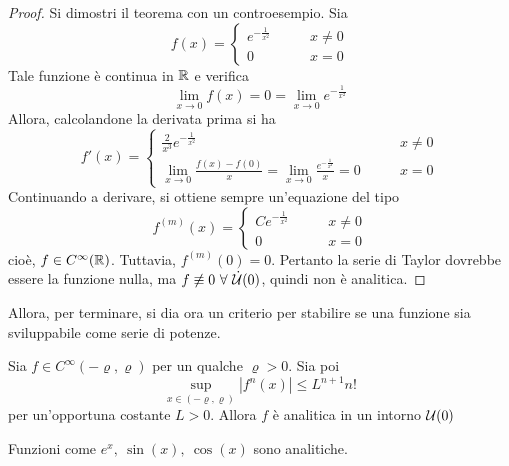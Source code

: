 \begin{proof}
 Si dimostri il teorema con un controesempio. Sia 
 \begin{equation}
     f(x)= \begin{cases}
         e^{-\frac{1}{x^2}} &\qquad x \neq 0\\
         0 &\qquad x=0
     \end{cases}
 \end{equation}
 Tale funzione è continua in $\mathbb{R}$ e verifica 
 \begin{equation}
     \lim_{x \to 0}{f(x)}=0= \lim_{x \to 0}{ e ^{-\frac{1}{x^2}}}
 \end{equation}
 Allora, calcolandone la derivata prima si ha 
 \begin{equation}
     f'(x)= \begin{cases}
         \frac{2}{x^3} e^{-\tfrac{1}{x^2}} & \qquad x \neq 0\\
         \lim\limits_{x \to 0}{\frac{f(x)-f(0)}{x}}= \lim\limits_{x \to 0}{\frac{e^{-\frac{1}{x^2}}}{x}}=0 &\qquad x=0
     \end{cases}
 \end{equation}
 Continuando a derivare, si ottiene sempre un'equazione del tipo
 \begin{equation}
     f^{(m)}(x)=\begin{cases}
         C e^{-\frac{1}{x^2}} &\qquad x\neq0\\
         0 &\qquad x=0
     \end{cases}
 \end{equation}
 cioè, $f \in C^\infty(\mathbb{R})$. Tuttavia, $f^{(m)}(0)=0$. Pertanto la serie di Taylor dovrebbe essere la funzione nulla, ma $f \not\equiv 0\ \forall\ \dot{\mathcal{U}}(0)$, quindi non è analitica.
\end{proof}
Allora, per terminare, si dia ora un criterio per stabilire se una funzione sia sviluppabile come serie di potenze.
\begin{theorem} \label{Teo: Criterio di sviluppabilità}
    Sia $f \in C^\infty(-\varrho, \varrho)$ per un qualche $\varrho>0$. Sia poi
    \begin{equation}
        \sup_{x \in (-\varrho, \varrho)}{|f^{n}(x)|}\leq L^{n+1}n!
    \end{equation}
    per un'opportuna costante $L>0$. Allora $f$ è analitica in un intorno $\mathcal{U}(0)$
\end{theorem}
\begin{oss}
    Funzioni come $e^x,\ \sin(x), \ \cos(x)$ sono analitiche.
\end{oss}
